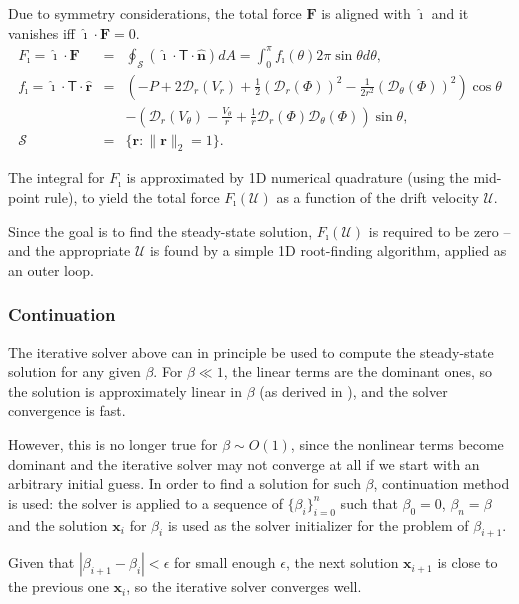 \documentclass[final]{elsarticle}
\newcommand\eps \epsilon
\newcommand{\pars}[1]{\left(#1\right)}
\newcommand\bF{\boldsymbol{F}}
\newcommand\bx{\boldsymbol{x}}
\newcommand\br{\boldsymbol{r}}
\newcommand\brhat{\hat{\br}}
\newcommand\bnhat{\hat{\boldsymbol{n}}}
\newcommand\cD{\mathcal{D}}
\newcommand\cU{\mathscr{U}}
\newcommand\tT{\mathsf{T}}
\newcommand\ui{\boldsymbol{\hat{\imath}}}
\begin{document}
Due to symmetry considerations, the total force $\bF$ is 
aligned with $\ui$ and it vanishes iff $\ui \cdot \bF = 0$.
\begin{eqnarray*}
F_\imath = \ui \cdot \bF &=& 
\oint_\mathcal{S} \pars{\ui \cdot \tT \cdot \bnhat} dA = 
\int_0^\pi f_\imath(\theta) 2\pi \sin\theta d\theta ,
\\  
f_\imath = \ui \cdot \tT \cdot \brhat &=& \pars{-P + 2\cD_r(V_r) + 
\frac{1}{2}\pars{\cD_r(\varPhi)}^2 - \frac{1}{2r^2}\pars{\cD_\theta(\varPhi)}^2}\cos\theta 
\\  
&& -\pars{\cD_r(V_\theta) - \frac{V_\theta}{r}
+ \frac{1}{r}\cD_r(\varPhi) \cD_{\theta}(\varPhi)}\sin\theta, \\
 \mathcal{S} &=& \{\br : \|\br\|_2 = 1\}.
\end{eqnarray*}

The integral for $F_\imath$ is approximated by 1D numerical quadrature
(using the mid-point rule), to yield 
the total force $F_\imath(\cU)$ as a function of the drift velocity $\cU$.

Since the goal is to find the steady-state solution, $F_\imath(\cU)$ 
is required to be zero --
and the appropriate $\cU$ is found by a simple 1D root-finding algorithm,
applied as an outer loop.

\subsubsection{Continuation}

The iterative solver above can in principle be used 
to compute the steady-state solution for any given $\beta$.
For $\beta \ll 1$, the linear terms are the dominant ones, 
so the solution is approximately linear in $\beta$ 
(as derived in \cite{yariv2010migration}), and the solver convergence is fast.

However, this is no longer true for $\beta \sim O(1)$, since the nonlinear terms become dominant
and the iterative solver may not converge at all if we start with an arbitrary initial guess.
In order to find a solution for such $\beta$, continuation method is used:
the solver is applied to a sequence of $\{\beta_i\}_{i=0}^n$ such that $\beta_0 = 0$,
$\beta_n = \beta$ and the solution $\bx_i$ for $\beta_i$ is used as the solver initializer
for the problem of $\beta_{i+1}$.

Given that $|\beta_{i+1} - \beta_i| < \eps$ for small enough $\eps$, 
the next solution $\bx_{i+1}$ is close to the previous one $\bx_i$,
so the iterative solver converges well.
\end{document}
